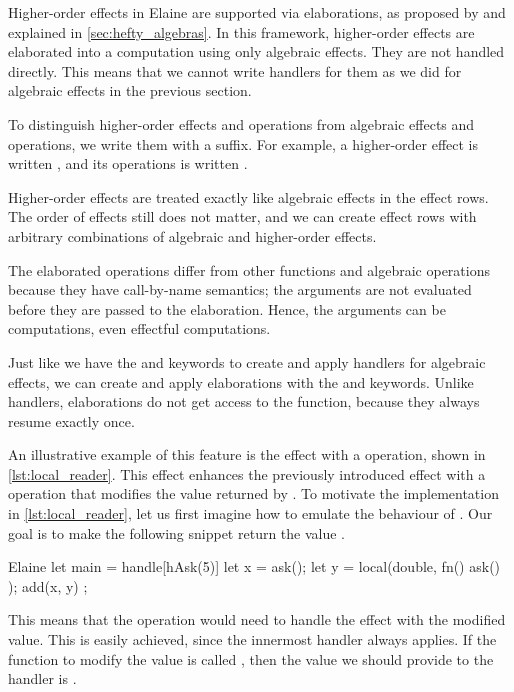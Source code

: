 Higher-order effects in Elaine are supported via elaborations, as proposed by \textcite{bach_poulsen_hefty_2023} and explained in \cref{sec:hefty_algebras}. In this framework, higher-order effects are elaborated into a computation using only algebraic effects. They are not handled directly. This means that we cannot write handlers for them as we did for algebraic effects in the previous section.

To distinguish higher-order effects and operations from algebraic effects and operations, we write them with a \el{!} suffix. For example, a higher-order  effect is written , and its  operations is written .

Higher-order effects are treated exactly like algebraic effects in the effect rows. The order of effects still does not matter, and we can create effect rows with arbitrary combinations of algebraic and higher-order effects.

The elaborated operations differ from other functions and algebraic operations because they have call-by-name semantics; the arguments are not evaluated before they are passed to the elaboration. Hence, the arguments can be computations, even effectful computations.

Just like we have the  and  keywords to create and apply handlers for algebraic effects, we can create and apply elaborations with the  and  keywords. Unlike handlers, elaborations do not get access to the  function, because they always resume exactly once.

An illustrative example of this feature is the  effect with a  operation, shown in \cref{lst:local_reader}. This effect enhances the previously introduced  effect with a  operation that modifies the value returned by . To motivate the implementation in \cref{lst:local_reader}, let us first imagine how to emulate the behaviour of . Our goal is to make the following snippet return the value .

\begin{lst}{Elaine}
let main = handle[hAsk(5)] {
    let x = ask();
    let y = local(double, fn() { ask() });
    add(x, y)
};
\end{lst}

This means that the  operation would need to handle the  effect with the modified value. This is easily achieved, since the innermost handler always applies. If the function to modify the value is called , then the value we should provide to the handler is .

